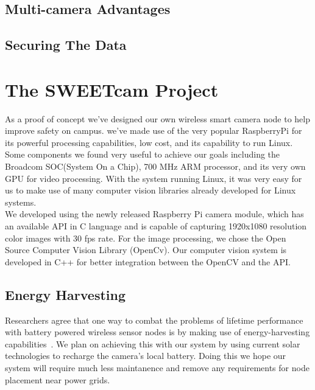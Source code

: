 \documentclass[journal,transmag]{IEEEtran}
\begin{document}
\subsection{Multi-camera Advantages}
\subsection{Securing The Data}


\section{The SWEETcam Project}
As a proof of concept we've designed our own wireless smart camera node to help improve safety on campus. we've made use of the very popular RaspberryPi for
its powerful processing capabilities, low cost, and its capability to run Linux. Some components we found very useful to achieve our goals including the 
Broadcom SOC(System On a Chip), 700 MHz ARM processor, and its very own GPU for video processing. With the system running Linux, it was very easy for us to
make use of many computer vision libraries already developed for Linux systems.\\
We developed using the newly released Raspberry Pi camera module, which has an available API in C language and is capable of capturing 1920x1080 resolution
color images with 30 fps rate. For the image processing, we chose the Open Source Computer Vision Library (OpenCv). Our computer vision system is developed in 
C++ for better integration between the OpenCV and the API.
\subsection{Energy Harvesting}
Researchers agree that one way to combat the problems of lifetime performance with battery powered wireless sensor nodes is by making use of energy-harvesting
capabilities~\cite{EnergyHarvesting}. We plan on achieving this with our system by using current solar technologies to recharge the camera's local battery. 
Doing this we hope our system will require much less maintanence and remove any requirements for node placement near power grids.
\end{document}
